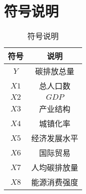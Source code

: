 \section{符号说明}
  \begin{table}[hb]
    \caption{符号说明}
    \label{tab:fuhaoshuoming}
    \centering
    \begin{tabular}{cc}
      \toprule[1.5pt]
      符号 & 说明 \\
      \midrule[1pt]
      $Y$ & 碳排放总量 \\
      $X1$ & 总人口数 \\
      $X2$ & $GDP$ \\
      $X3$ & 产业结构 \\
      $X4$ & 城镇化率 \\
      $X5$ & 经济发展水平 \\
      $X6$ & 国际贸易 \\
      $X7$ & 人均碳排放量 \\
      $X8$ & 能源消费强度 \\
      \bottomrule[1.5pt]
    \end{tabular}
  \end{table}